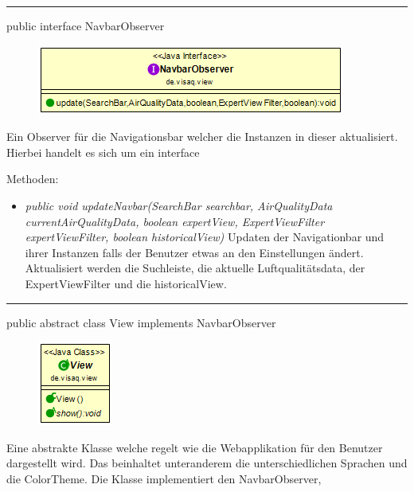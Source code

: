 \rule{\textwidth}{0.4pt} 
public interface NavbarObserver 

\begin{minipage}{0.4\textwidth}
    \begin{figure}[H]
        \includegraphics[scale = 0.5]{media/frontend/view/de.view/NavbarObserver_Class.png}
    \end{figure}
    \end{minipage} \hfill
    \begin{minipage}{0.4\textwidth}
Ein Observer für die Navigationsbar welcher die Instanzen in dieser aktualisiert. Hierbei handelt es sich um ein interface
\end{minipage}

Methoden:
\begin{itemize} 
    \item \emph{public void updateNavbar(SearchBar searchbar, AirQualityData currentAirQualityData,
    boolean expertView, ExpertViewFilter expertViewFilter, boolean historicalView)} Updaten der Navigationbar und ihrer Instanzen falls der Benutzer etwas an den Einstellungen ändert. Aktualisiert werden die Suchleiste, die aktuelle Luftqualitätsdata, der ExpertViewFilter und die historicalView.
\end{itemize}

\rule{\textwidth}{0.4pt} 
public abstract class View implements NavbarObserver

\begin{minipage}{0.3\textwidth}
    \begin{figure}[H]
        \includegraphics[scale = 0.7]{media/frontend/view/de.view/View_Class.png}
    \end{figure}
    \end{minipage} \hfill
    \begin{minipage}{0.6\textwidth}
Eine abstrakte Klasse welche regelt wie die Webapplikation für den Benutzer dargestellt wird. Das beinhaltet unteranderem die unterschiedlichen Sprachen und die ColorTheme. Die Klasse implementiert den NavbarObserver,
\end{minipage}

